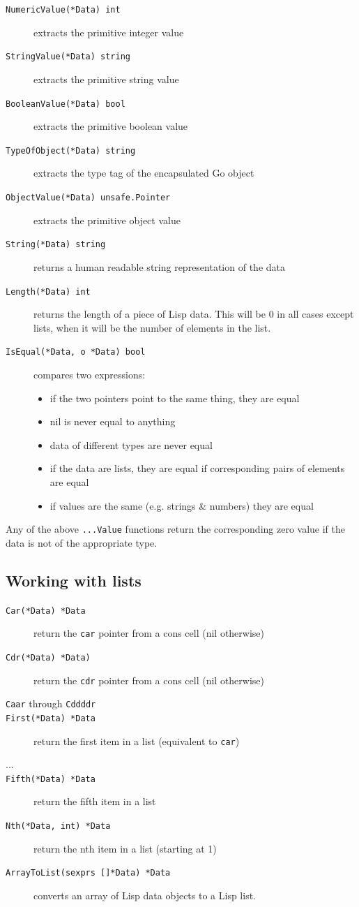 \documentclass[12pt]{article}
\begin{document}
\begin{description}
\item [{\tt NumericValue(*Data) int}] extracts the primitive integer value
\item [{\tt StringValue(*Data) string}] extracts the primitive
  string value
\item [{\tt BooleanValue(*Data) bool}] extracts the primitive
  boolean value
\item [{\tt TypeOfObject(*Data) string}] extracts the type tag of the
    encapsulated Go object
\item [{\tt ObjectValue(*Data) unsafe.Pointer}] extracts the
  primitive object value
\item [{\tt String(*Data) string}] returns a human readable string
  representation of the data 
\item [{\tt Length(*Data) int}] returns the length of a piece of Lisp 
  data. This will be 0 in all cases except lists, when it will be the
  number of elements in the list.
\item [{\tt IsEqual(*Data, o *Data) bool}] compares two expressions:
  \begin{itemize}
  \item if the two pointers point to the same thing, they are equal
  \item nil is never equal to anything
  \item data of different types are never equal
  \item if the data are lists, they are equal if corresponding pairs
    of elements are equal
  \item if values are the same (e.g. strings \& numbers) they are equal
  \end{itemize}
\end{description}

\noindent Any of the above \verb|...Value| functions return the
corresponding zero value if the data is 
not of the appropriate type.

\subsection{Working with lists}

\begin{description}
\item [{\tt Car(*Data) *Data}] return the \verb|car| pointer from a cons
  cell (nil otherwise)
\item [{\tt Cdr(*Data) *Data)}] return the \verb|cdr| pointer from a cons
  cell (nil otherwise)
\item [{\tt Caar} through {\tt Cddddr}]
\item [{\tt First(*Data) *Data}] return the first item in a list
  (equivalent to \verb|car|)
\item [...]
\item [{\tt Fifth(*Data) *Data}] return the fifth item in a list
\item [{\tt Nth(*Data, int) *Data}] return the nth item in a list
  (starting at 1)
\item [{\tt ArrayToList(sexprs []*Data) *Data}] converts an array of
  Lisp data objects to a Lisp list.
\end{description}
\end{document}
